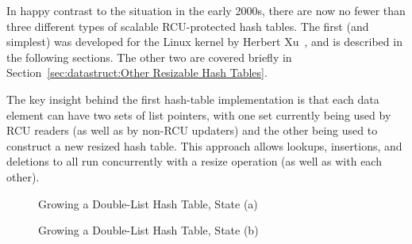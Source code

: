 In happy contrast to the situation in the early 2000s, there are now
no fewer than three different types of scalable RCU-protected hash
tables.
The first (and simplest) was developed for the Linux kernel by
Herbert Xu~\cite{HerbertXu2010RCUResizeHash}, and is described in the
following sections.
The other two are covered briefly in
Section~\ref{sec:datastruct:Other Resizable Hash Tables}.

The key insight behind the first hash-table implementation is that
each data element can have two sets of list pointers, with one set
currently being used by RCU readers (as well as by non-RCU updaters)
and the other being used to construct a new resized hash table.
This approach allows lookups, insertions, and deletions to all run
concurrently with a resize operation (as well as with each other).

\begin{figure}[tb]
\centering
{}
\caption{Growing a Double-List Hash Table, State (a)}
\label{fig:datastruct:Growing a Double-List Hash Table, State (a)}
\end{figure}

\begin{figure}[tb]
\centering
{}
\caption{Growing a Double-List Hash Table, State (b)}
\label{fig:datastruct:Growing a Double-List Hash Table, State (b)}
\end{figure}

